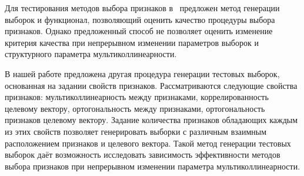 \documentclass[a4paper,12pt]{article}
\theoremstyle{plain}
\begin{document}
%
%

Для тестирования методов выбора признаков в~\cite{performChong} предложен метод генерации выборок и функционал, позволяющий оценить качество процедуры выбора признаков. Однако предложенный способ не позволяет оценить изменение критерия качества при непрерывном изменении параметров выборок и структурного параметра мультиколлинеарности. 

В нашей работе предложена другая процедура генерации тестовых выборок, основанная на задании свойств признаков. Рассматриваются следующие свойства признаков: мультиколлинеарность между признаками, коррелированность целевому вектору, ортогональность между признаками, ортогональность признаков целевому вектору. Задание количества признаков обладающих каждым из этих свойств позволяет генерировать выборки с различным взаимным расположением признаков и целевого вектора. Такой метод генерации тестовых выборок даёт возможность исследовать зависимость эффективности методов выбора признаков при непрерывном изменении параметра мультиколлинеарности. 
\end{document}
